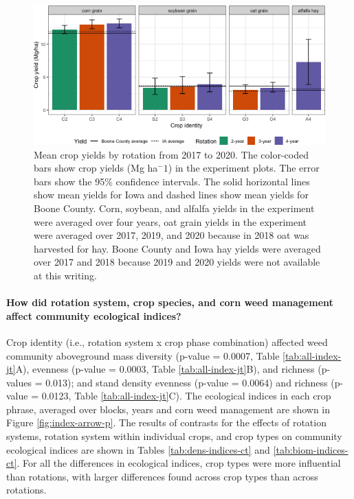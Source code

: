 \documentclass[
]{article}
\begin{document}
\begin{figure}
\centering
\includegraphics{Manuscript_whole_files/figure-latex/crop-bar-1.png}
\caption{\label{fig:crop-bar}Mean crop yields by rotation from 2017 to 2020. The color-coded bars show crop yields (Mg ha\(^-1\)) in the experiment plots. The error bars show the 95\% confidence intervals. The solid horizontal lines show mean yields for Iowa and dashed lines show mean yields for Boone County. Corn, soybean, and alfalfa yields in the experiment were averaged over four years, oat grain yields in the experiment were averaged over 2017, 2019, and 2020 because in 2018 oat was harvested for hay. Boone County and Iowa hay yields were averaged over 2017 and 2018 because 2019 and 2020 yields were not available at this writing.}
\end{figure}

\hypertarget{how-did-rotation-system-crop-species-and-corn-weed-management-affect-community-ecological-indices}{%
\paragraph*{How did rotation system, crop species, and corn weed management affect community ecological indices?}\label{how-did-rotation-system-crop-species-and-corn-weed-management-affect-community-ecological-indices}}

Crop identity (i.e., rotation system x crop phase combination) affected weed community aboveground mass diversity (p-value = 0.0007, Table \ref{tab:all-index-jt}A), evenness (p-value = 0.0003, Table \ref{tab:all-index-jt}B), and richness (p-values = 0.013); and stand density evenness (p-value = 0.0064) and richness (p-value = 0.0123, Table \ref{tab:all-index-jt}C). The ecological indices in each crop phrase, averaged over blocks, years and corn weed management are shown in Figure \ref{fig:index-arrow-p}. The results of contrasts for the effects of rotation systems, rotation system within individual crops, and crop types on community ecological indices are shown in Tables \ref{tab:dens-indices-ct} and \ref{tab:biom-indices-ct}. For all the differences in ecological indices, crop types were more influential than rotations, with larger differences found across crop types than across rotations.
\end{document}

